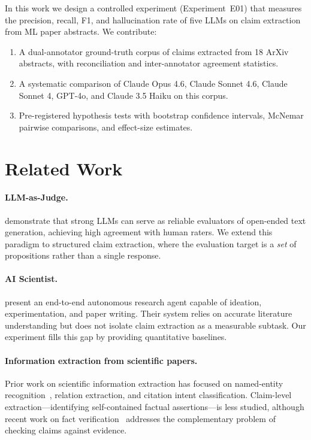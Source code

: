 \documentclass[11pt,a4paper]{article}
\begin{document}
In this work we design a controlled experiment (Experiment~E01) that
measures the precision, recall, F1, and hallucination rate of five LLMs
on claim extraction from ML paper abstracts.  We contribute:

\begin{enumerate}
  \item A dual-annotator ground-truth corpus of claims extracted from
        18 ArXiv abstracts, with reconciliation and inter-annotator
        agreement statistics.
  \item A systematic comparison of Claude Opus 4.6, Claude Sonnet 4.6,
        Claude Sonnet 4, GPT-4o, and Claude 3.5 Haiku on this corpus.
  \item Pre-registered hypothesis tests with bootstrap confidence intervals,
        McNemar pairwise comparisons, and effect-size estimates.
\end{enumerate}

\section{Related Work}
\label{sec:related}

\paragraph{LLM-as-Judge.}
\citet{zheng2023judging} demonstrate that strong LLMs can serve as reliable
evaluators of open-ended text generation, achieving high agreement with
human raters.  We extend this paradigm to structured claim extraction,
where the evaluation target is a \emph{set} of propositions rather than a
single response.

\paragraph{AI Scientist.}
\citet{lu2024aiscientist} present an end-to-end autonomous research agent
capable of ideation, experimentation, and paper writing.  Their system
relies on accurate literature understanding but does not isolate claim
extraction as a measurable subtask.  Our experiment fills this gap by
providing quantitative baselines.

\paragraph{Information extraction from scientific papers.}
Prior work on scientific information extraction has focused on named-entity
recognition~\citep{beltagy2019scibert}, relation extraction, and citation
intent classification.  Claim-level extraction---identifying self-contained
factual assertions---is less studied, although recent work on fact
verification~\citep{wadden2020fact} addresses the complementary problem of
checking claims against evidence.
\end{document}
